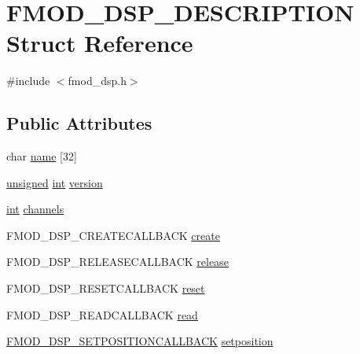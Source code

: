 \hypertarget{struct_f_m_o_d___d_s_p___d_e_s_c_r_i_p_t_i_o_n}{\section{F\-M\-O\-D\-\_\-\-D\-S\-P\-\_\-\-D\-E\-S\-C\-R\-I\-P\-T\-I\-O\-N Struct Reference}
\label{struct_f_m_o_d___d_s_p___d_e_s_c_r_i_p_t_i_o_n}
}


{\ttfamily \#include $<$fmod\-\_\-dsp.\-h$>$}

\subsection*{Public Attributes}
\begin{DoxyCompactItemize}
\item 
char \hyperlink{struct_f_m_o_d___d_s_p___d_e_s_c_r_i_p_t_i_o_n_a936bbb2616344ea745f21fcb86201497}{name} \mbox{[}32\mbox{]}
\item 
\hyperlink{_free_image_8h_a425076c7067a1b5166e2cc530e914814}{unsigned} \hyperlink{wglew_8h_a500a82aecba06f4550f6849b8099ca21}{int} \hyperlink{struct_f_m_o_d___d_s_p___d_e_s_c_r_i_p_t_i_o_n_a2b39be891bd32c184883a673348bd29a}{version}
\item 
\hyperlink{wglew_8h_a500a82aecba06f4550f6849b8099ca21}{int} \hyperlink{struct_f_m_o_d___d_s_p___d_e_s_c_r_i_p_t_i_o_n_a6d8bbb62ed1b5bd7a5a90b6e3687360d}{channels}
\item 
F\-M\-O\-D\-\_\-\-D\-S\-P\-\_\-\-C\-R\-E\-A\-T\-E\-C\-A\-L\-L\-B\-A\-C\-K \hyperlink{struct_f_m_o_d___d_s_p___d_e_s_c_r_i_p_t_i_o_n_ab5425909d6162252d06da751ffc971ed}{create}
\item 
F\-M\-O\-D\-\_\-\-D\-S\-P\-\_\-\-R\-E\-L\-E\-A\-S\-E\-C\-A\-L\-L\-B\-A\-C\-K \hyperlink{struct_f_m_o_d___d_s_p___d_e_s_c_r_i_p_t_i_o_n_a39af498cf54ff7d6f7dd8ffbaaf238d7}{release}
\item 
F\-M\-O\-D\-\_\-\-D\-S\-P\-\_\-\-R\-E\-S\-E\-T\-C\-A\-L\-L\-B\-A\-C\-K \hyperlink{struct_f_m_o_d___d_s_p___d_e_s_c_r_i_p_t_i_o_n_a837aca99489149f6eb46cfa4da0a03c9}{reset}
\item 
F\-M\-O\-D\-\_\-\-D\-S\-P\-\_\-\-R\-E\-A\-D\-C\-A\-L\-L\-B\-A\-C\-K \hyperlink{struct_f_m_o_d___d_s_p___d_e_s_c_r_i_p_t_i_o_n_a1c33b7154583cb5b1f650df7384f323f}{read}
\item 
\hyperlink{fmod__dsp_8h_a84ca90fe34da0d9dc1e3ab8164ba626f}{F\-M\-O\-D\-\_\-\-D\-S\-P\-\_\-\-S\-E\-T\-P\-O\-S\-I\-T\-I\-O\-N\-C\-A\-L\-L\-B\-A\-C\-K} \hyperlink{struct_f_m_o_d___d_s_p___d_e_s_c_r_i_p_t_i_o_n_a27a9b7951bdc37fe319b26c98222d9db}{setposition}

\end{DoxyCompactItemize}
